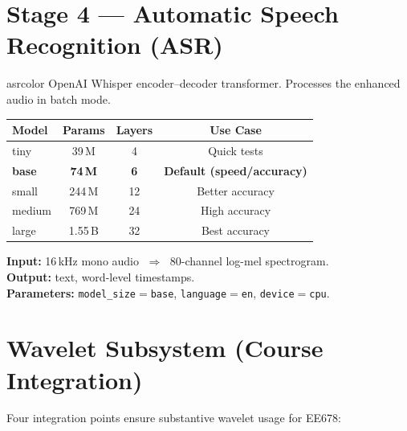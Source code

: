 \documentclass[11pt,a4paper]{article}
\begin{document}
\section{Stage 4 --- Automatic Speech Recognition (ASR)}

\begin{modulebox}{asrcolor}
OpenAI Whisper encoder--decoder transformer. Processes the enhanced audio in batch mode.

\medskip
\begin{center}
\begin{tabular}{lccc}
\toprule
\textbf{Model} & \textbf{Params} & \textbf{Layers} & \textbf{Use Case}\\
\midrule
tiny & 39\,M & 4 & Quick tests\\
\textbf{base} & \textbf{74\,M} & \textbf{6} & \textbf{Default (speed/accuracy)}\\
small & 244\,M & 12 & Better accuracy\\
medium & 769\,M & 24 & High accuracy\\
large & 1.55\,B & 32 & Best accuracy\\
\bottomrule
\end{tabular}
\end{center}

\noindent\textbf{Input:} 16\,kHz mono audio $\;\Rightarrow\;$ 80-channel log-mel spectrogram.\\
\textbf{Output:} text, word-level timestamps.\\
\textbf{Parameters:} \texttt{model\_size}$=$\texttt{base}, \texttt{language}$=$\texttt{en}, \texttt{device}$=$\texttt{cpu}.
\end{modulebox}

\section{Wavelet Subsystem (Course Integration)}

Four integration points ensure substantive wavelet usage for EE678:
\end{document}
